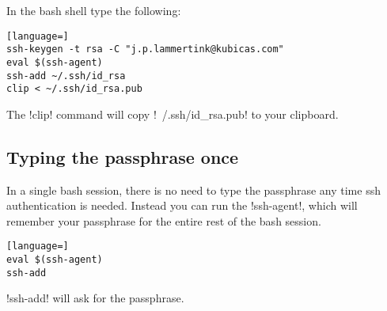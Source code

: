 In the bash shell type the following:

\begin{lstlisting}[language=]
ssh-keygen -t rsa -C "j.p.lammertink@kubicas.com"
eval $(ssh-agent)
ssh-add ~/.ssh/id_rsa
clip < ~/.ssh/id_rsa.pub
\end{lstlisting}

\noindent
The !clip! command will copy !~/.ssh/id_rsa.pub! to your clipboard.

\subsection{Typing the passphrase once}


In a single bash session, there is no need to type the passphrase any time ssh
authentication is needed. Instead you can run the !ssh-agent!, which will
remember your passphrase for the entire rest of the bash session.

\begin{lstlisting}[language=]
eval $(ssh-agent)
ssh-add
\end{lstlisting}

\noindent
!ssh-add! will ask for the passphrase.
